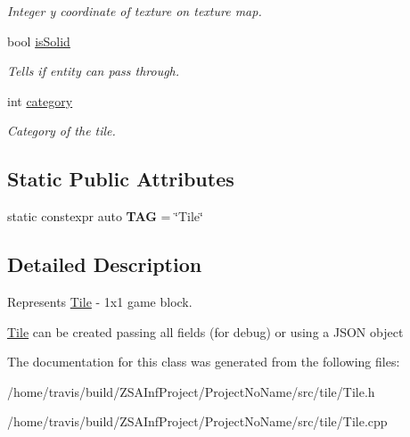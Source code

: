 \begin{DoxyCompactItemize}
\begin{DoxyCompactList}\small\item\em Integer y coordinate of texture on texture map. \end{DoxyCompactList}\item 
\hypertarget{classTile_a3a32e61b42ec4bc8bb1d924261c19403}{bool \hyperlink{classTile_a3a32e61b42ec4bc8bb1d924261c19403}{is\-Solid}}\label{classTile_a3a32e61b42ec4bc8bb1d924261c19403}

\begin{DoxyCompactList}\small\item\em Tells if entity can pass through. \end{DoxyCompactList}\item 
\hypertarget{classTile_ae2d870936fb8ae7df7fdd74f4cb27035}{int \hyperlink{classTile_ae2d870936fb8ae7df7fdd74f4cb27035}{category}}\label{classTile_ae2d870936fb8ae7df7fdd74f4cb27035}

\begin{DoxyCompactList}\small\item\em Category of the tile. \end{DoxyCompactList}\end{DoxyCompactItemize}
\subsection*{Static Public Attributes}
\begin{DoxyCompactItemize}
\item 
\hypertarget{classTile_a132be67261c6302553fa1114e4319c0c}{static constexpr auto {\bfseries T\-A\-G} = \char`\"{}Tile\char`\"{}}\label{classTile_a132be67261c6302553fa1114e4319c0c}

\end{DoxyCompactItemize}


\subsection{Detailed Description}
Represents \hyperlink{classTile}{Tile} -\/ 1x1 game block. 

\hyperlink{classTile}{Tile} can be created passing all fields (for debug) or using a J\-S\-O\-N object 

The documentation for this class was generated from the following files\-:\begin{DoxyCompactItemize}
\item 
/home/travis/build/\-Z\-S\-A\-Inf\-Project/\-Project\-No\-Name/src/tile/Tile.\-h\item 
/home/travis/build/\-Z\-S\-A\-Inf\-Project/\-Project\-No\-Name/src/tile/Tile.\-cpp\end{DoxyCompactItemize}
